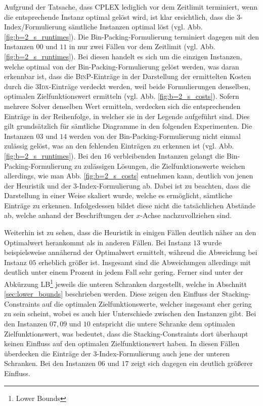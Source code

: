 Aufgrund der Tatsache, dass \textsc{CPLEX} lediglich vor dem Zeitlimit terminiert, wenn die entsprechende Instanz optimal gelöst wird, ist klar ersichtlich, dass die 3-Index\-/Formulierung sämtliche Instanzen optimal löst (vgl. Abb. \ref{fig:b=2_s_runtimes}).
Die Bin-Packing-Formulierung terminiert dagegen mit den Instanzen $00$ und $11$ in nur zwei Fällen vor dem Zeitlimit (vgl. Abb. \ref{fig:b=2_s_runtimes}). Bei diesen handelt es sich um die einzigen Instanzen, welche optimal von der Bin-Packing-Formulierung gelöst werden, was daran erkennbar ist, dass die \textsc{BinP}-Einträge in der Darstellung der ermittelten Kosten durch die \textsc{3Idx}-Einträge verdeckt werden, weil beide Formulierungen denselben, optimalen Zielfunktionswert ermitteln (vgl. Abb. \ref{fig:b=2_s_costs}).
Sofern mehrere Solver denselben Wert ermitteln, verdecken sich die entsprechenden Einträge in der Reihenfolge, in welcher sie in der Legende aufgeführt sind. Dies gilt grundsätzlich für sämtliche Diagramme in den folgenden Experimenten.
Die Instanzen $03$ und $14$ werden von der Bin-Packing-Formulierung nicht einmal zulässig gelöst, was an den fehlenden
Einträgen zu erkennen ist (vgl. Abb. \ref{fig:b=2_s_runtimes}). Bei den $16$ verbleibenden Instanzen gelangt die Bin-Packing-Formulierung zu zulässigen Lösungen, die Zielfunktionswerte weichen allerdings, wie man Abb. \ref{fig:b=2_s_costs} entnehmen kann, deutlich von jenen der Heuristik und der 3-Index-Formulierung ab. Dabei ist zu beachten, dass die Darstellung in einer Weise skaliert wurde, welche es ermöglicht, sämtliche Einträge zu erkennen. Infolgedessen bildet diese nicht die tatsächlichen Abstände ab, welche anhand der Beschriftungen der $x$-Achse nachzuvollziehen sind.

Weiterhin ist zu sehen, dass die Heuristik in einigen Fällen deutlich näher an den Optimalwert herankommt als in anderen Fällen.
Bei Instanz $13$ wurde beispielsweise annähernd der Optimalwert ermittelt, während die Abweichung bei Instanz
$05$ erheblich größer ist. Insgesamt sind die Abweichungen allerdings mit deutlich unter einem Prozent in jedem
Fall sehr gering. Ferner sind unter der Abkürzung \textsc{LB\footnote{Lower Bounds}} jeweils die unteren Schranken dargestellt, welche in Abschnitt \ref{sec:lower_bounds} beschrieben werden. Diese zeigen den Einfluss der Stacking-Constraints auf die optimalen Zielfunktionswerte, welcher insgesamt eher gering zu sein scheint, wobei es auch hier Unterschiede zwischen den Instanzen gibt. Bei den Instanzen $07, 09$ und $10$ entspricht die untere Schranke dem optimalen Zielfunktionswert, was bedeutet, dass die Stacking-Constraints dort überhaupt keinen Einfluss auf den optimalen Zielfunktionswert haben.
In diesen Fällen überdecken die Einträge der 3-Index-Formulierung auch jene der unteren Schranken. Bei den Instanzen
$06$ und $17$ zeigt sich dagegen ein deutlich größerer Einfluss.

